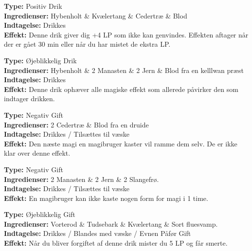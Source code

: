 \begin{drik*}[Jernhud]
\textbf{Type:} Positiv Drik\\
\textbf{Ingredienser:} Hybenholt \& Kvælertang \& Cedertræ \& Blod\\
\textbf{Indtagelse:} Drikkes\\
\textbf{Effekt:} Denne drik giver dig +4 LP som ikke kan genvindes. Effekten aftager når der er gået 30 min eller når du har mistet de ekstra LP.\\
\end{drik*}

\begin{drik*}
\textbf{Type:} Øjeblikkelig Drik\\
\textbf{Ingredienser:} Hybenholt \& 2 Manasten \& 2 Jern \& Blod fra en kelllwan præst\\
\textbf{Indtagelse:} Drikkes\\
\textbf{Effekt:} Denne drik ophæver alle magiske effekt som allerede påvirker den som indtager drikken.\\
\end{drik*}

\begin{gift*}
\textbf{Type:} Negativ Gift\\
\textbf{Ingredienser:} 2 Cedertræ \& Blod fra en druide\\
\textbf{Indtagelse:} Drikkes / Tilsættes til væske\\
\textbf{Effekt:} Den næste magi en magibruger kaster vil ramme dem selv. De er ikke klar over denne effekt.\\
\end{gift*}

\begin{gift*}
\textbf{Type:} Negativ Gift\\
\textbf{Ingredienser:} 2 Manasten \& 2 Jern \& 2 Slangefrø.\\
\textbf{Indtagelse:} Drikkes / Tilsættes til væske\\
\textbf{Effekt:} En magibruger kan ikke kaste nogen form for magi i 1 time.\\
\end{gift*}

\begin{gift*}
\textbf{Type:} Øjeblikkelig Gift\\
\textbf{Ingredienser:} Vorterod \& Tudsebark \& Kvælertang \& Sort fluesvamp.\\
\textbf{Indtagelse:} Drikkes / Blandes med væske / Evnen Påfør Gift\\
\textbf{Effekt:} Når du bliver forgiftet af denne drik mister du 5 LP og får smerte.\\
\end{gift*}

